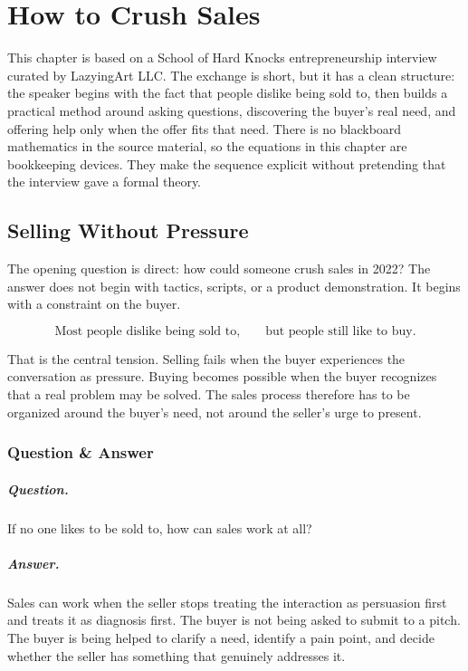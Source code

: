 \chapter{How to Crush Sales}

This chapter is based on a School of Hard Knocks entrepreneurship interview curated by LazyingArt LLC. The exchange is short, but it has a clean structure: the speaker begins with the fact that people dislike being sold to, then builds a practical method around asking questions, discovering the buyer's real need, and offering help only when the offer fits that need. There is no blackboard mathematics in the source material, so the equations in this chapter are bookkeeping devices. They make the sequence explicit without pretending that the interview gave a formal theory.

\section{Selling Without Pressure}

The opening question is direct: how could someone crush sales in 2022? The answer does not begin with tactics, scripts, or a product demonstration. It begins with a constraint on the buyer.

\begin{equation}
\text{Most people dislike being sold to,}
\qquad
\text{but people still like to buy.}
\end{equation}

That is the central tension. Selling fails when the buyer experiences the conversation as pressure. Buying becomes possible when the buyer recognizes that a real problem may be solved. The sales process therefore has to be organized around the buyer's need, not around the seller's urge to present.

\subsection{Question \& Answer}

\paragraph{Question.}
If no one likes to be sold to, how can sales work at all?

\paragraph{Answer.}
Sales can work when the seller stops treating the interaction as persuasion first and treats it as diagnosis first. The buyer is not being asked to submit to a pitch. The buyer is being helped to clarify a need, identify a pain point, and decide whether the seller has something that genuinely addresses it.

